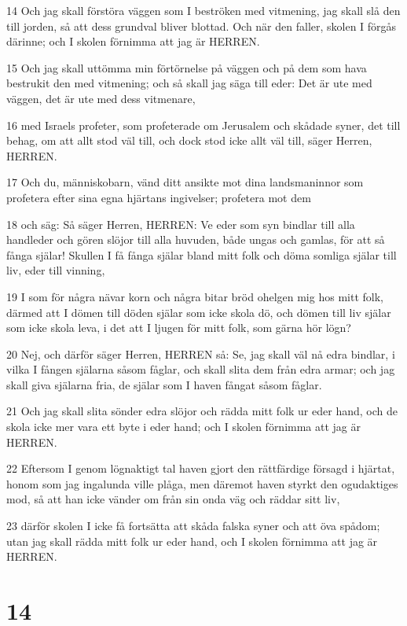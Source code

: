 \par 14 Och jag skall förstöra väggen som I beströken med vitmening, jag skall slå den till jorden, så att dess grundval bliver blottad. Och när den faller, skolen I förgås därinne; och I skolen förnimma att jag är HERREN.
\par 15 Och jag skall uttömma min förtörnelse på väggen och på dem som hava bestrukit den med vitmening; och så skall jag säga till eder: Det är ute med väggen, det är ute med dess vitmenare,
\par 16 med Israels profeter, som profeterade om Jerusalem och skådade syner, det till behag, om att allt stod väl till, och dock stod icke allt väl till, säger Herren, HERREN.
\par 17 Och du, människobarn, vänd ditt ansikte mot dina landsmaninnor som profetera efter sina egna hjärtans ingivelser; profetera mot dem
\par 18 och säg: Så säger Herren, HERREN: Ve eder som syn bindlar till alla handleder och gören slöjor till alla huvuden, både ungas och gamlas, för att så fånga själar! Skullen I få fånga själar bland mitt folk och döma somliga själar till liv, eder till vinning,
\par 19 I som för några nävar korn och några bitar bröd ohelgen mig hos mitt folk, därmed att I dömen till döden själar som icke skola dö, och dömen till liv själar som icke skola leva, i det att I ljugen för mitt folk, som gärna hör lögn?
\par 20 Nej, och därför säger Herren, HERREN så: Se, jag skall väl nå edra bindlar, i vilka I fången själarna såsom fåglar, och skall slita dem från edra armar; och jag skall giva själarna fria, de själar som I haven fångat såsom fåglar.
\par 21 Och jag skall slita sönder edra slöjor och rädda mitt folk ur eder hand, och de skola icke mer vara ett byte i eder hand; och I skolen förnimma att jag är HERREN.
\par 22 Eftersom I genom lögnaktigt tal haven gjort den rättfärdige försagd i hjärtat, honom som jag ingalunda ville plåga, men däremot haven styrkt den ogudaktiges mod, så att han icke vänder om från sin onda väg och räddar sitt liv,
\par 23 därför skolen I icke få fortsätta att skåda falska syner och att öva spådom; utan jag skall rädda mitt folk ur eder hand, och I skolen förnimma att jag är HERREN.

\chapter{14}


